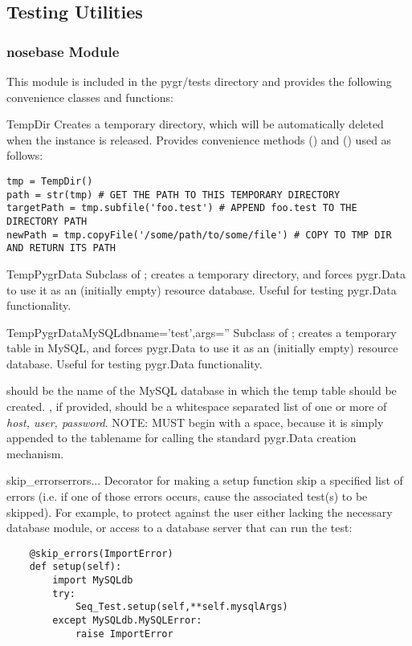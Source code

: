\documentclass{howto}
\begin{document}
\subsection{Testing Utilities}
\subsubsection{nosebase Module}
This module is included in the pygr/tests directory and provides the following
convenience classes and functions:
\begin{funcdesc}{TempDir}{}
  Creates a temporary directory, which will be automatically deleted
  when the  instance is released.  Provides convenience methods
  () and () used as follows:
\begin{verbatim}
tmp = TempDir()
path = str(tmp) # GET THE PATH TO THIS TEMPORARY DIRECTORY
targetPath = tmp.subfile('foo.test') # APPEND foo.test TO THE DIRECTORY PATH
newPath = tmp.copyFile('/some/path/to/some/file') # COPY TO TMP DIR AND RETURN ITS PATH
\end{verbatim}
\end{funcdesc}

\begin{funcdesc}{TempPygrData}{}
  Subclass of ; creates a temporary directory,
  and forces pygr.Data to use it as an (initially
  empty) resource database.  Useful for testing pygr.Data functionality.  
\end{funcdesc}

\begin{funcdesc}{TempPygrDataMySQL}{dbname='test',args=''}
  Subclass of ; creates a temporary table in MySQL,
  and forces pygr.Data to use it as an (initially
  empty) resource database.  Useful for testing pygr.Data functionality. 

   should be the name of the MySQL database in which the temp
  table should be created.  , if provided, should be a whitespace
  separated list of one or more of {\em host, user, password}.  NOTE: 
  MUST begin with a space, because it is simply appended to the tablename for
  calling the standard pygr.Data creation mechanism.
\end{funcdesc}

\begin{funcdesc}{skip_errors}{errors...}
  Decorator for making a setup function skip a specified list of errors
  (i.e. if one of those errors occurs, cause the associated test(s) to be skipped).
  For example, to protect against the user either lacking the necessary 
  database module, or access to a database server that can run the test:
\begin{verbatim}
    @skip_errors(ImportError)
    def setup(self):
        import MySQLdb
        try:
            Seq_Test.setup(self,**self.mysqlArgs)
        except MySQLdb.MySQLError:
            raise ImportError
\end{verbatim}
\end{funcdesc}
\end{document}
